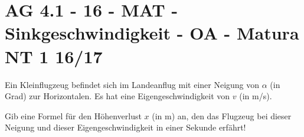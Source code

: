 \section{AG 4.1 - 16 - MAT - Sinkgeschwindigkeit - OA - Matura NT 1 16/17}

\begin{beispiel}[AG 4.1]{1} %
Ein Kleinflugzeug befindet sich im Landeanflug mit einer Neigung von $\alpha$ (in Grad) zur Horizontalen. Es hat eine Eigengeschwindigkeit von $v$ (in m/s).

Gib eine Formel für den Höhenverlust $x$ (in m) an, den das Flugzeug bei dieser Neigung und dieser Eigengeschwindigkeit in einer Sekunde erfährt!

\end{beispiel}